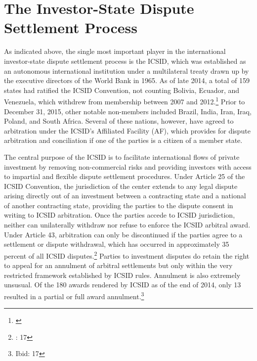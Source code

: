 \documentclass[12pt,onesided]{amsart}
\begin{document}
\section*{The Investor-State Dispute Settlement Process}

As indicated above, the single most important player in the international investor-state dispute settlement process is the ICSID, which was established as an autonomous international institution under a multilateral treaty drawn up by the executive directors of the World Bank in 1965. As of late 2014, a total of 159 states had ratified the ICSID Convention, not counting Bolivia, Ecuador, and Venezuela, which withdrew from membership between 2007 and 2012.\footnote{\citet{icsid:2014b}}  Prior to December 31, 2015, other notable non-members included Brazil, India, Iran, Iraq, Poland, and South Africa. Several of these nations, however, have agreed to arbitration under the ICSID's Affiliated Facility (AF), which provides for dispute arbitration and conciliation if one of the parties is a citizen of a member state. 


The central purpose of the ICSID is to facilitate international flows of private investment by removing non-commercial risks and providing investors with access to impartial and flexible dispute settlement procedures. Under Article 25 of the ICSID Convention, the jurisdiction of the center extends to any legal dispute arising directly out of an investment between a contracting state and a national of another contracting state, providing the parties to the dispute consent in writing to ICSID arbitration. Once the parties accede to ICSID jurisdiction, neither can unilaterally withdraw nor refuse to enforce the ICSID arbitral award. Under Article 43, arbitration can only be discontinued if the parties agree to a settlement or dispute withdrawal, which has occurred in approximately 35 percent of all ICSID disputes.\footnote{\citet{icsid:2015}: 17} Parties to investment disputes do retain the right to appeal for an annulment of arbitral settlements but only within the very restricted framework established by ICSID rules. Annulment is also extremely unsusual. Of the 180 awards rendered by ICSID as of the end of 2014, only 13 resulted in a partial or full award annulment.\footnote{Ibid: 17}
\end{document}
